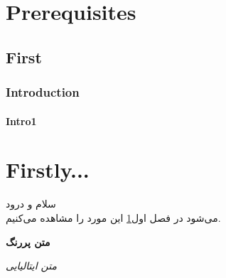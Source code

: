 \documentclass{book}
\author{علی}
\begin{document}
	\maketitle
\tableofcontents
\singlespacing

\chapter{Prerequisites}\label{chap1}
\section{First}
\subsection{Introduction}
\subsubsection{Intro1}
\begin{flushleft}
\end{flushleft}

\chapter{Firstly...}\label{chap2}
	 سلام و درود
	 \\
	 می‌شود در فصل اول\ref{chap1} این مورد را مشاهده می‌کنیم.
	 
	 \textbf{متن پررنگ}
	 
	 \textit{متن ایتالیایی}
	 
\end{document}
